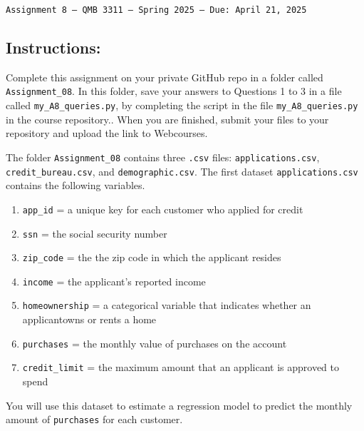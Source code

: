 \documentclass[11pt]{exam}
\begin{document}
\texttt{Assignment 8 --- QMB 3311 ---  Spring 2025 --- Due: April 21, 2025}

\subsection*{Instructions:}

Complete this assignment on your private GitHub repo in a folder called \texttt{Assignment\_08}. In this folder, save your answers to Questions 1 to 3 in a file called \texttt{my\_A8\_queries.py}, by completing the script in the file \texttt{my\_A8\_queries.py} in the course repository.. When you are finished, submit your files to your repository and upload the link to Webcourses.

    \begin{questions}

\question The folder \texttt{Assignment\_08} contains three \texttt{.csv} files: \texttt{applications.csv}, \texttt{credit\_bureau.csv}, and \texttt{demographic.csv}. The first dataset \texttt{applications.csv} contains the following variables.

\begin{enumerate}
\item \texttt{app\_id} = a unique key for each customer who applied for credit
\item \texttt{ssn} = the social security number
\item \texttt{zip\_code} = the the zip code in which the applicant resides
\item \texttt{income} = the applicant's reported income
\item \texttt{homeownership} = a categorical variable that indicates whether an applicantowns or rents a home
\item \texttt{purchases} = the monthly value of purchases on the account
\item \texttt{credit\_limit} = the maximum amount that an applicant is approved to spend
\end{enumerate}

You will use this dataset to estimate a regression model to predict the monthly amount of \texttt{purchases} for each customer.

\end{questions}
\end{document}
